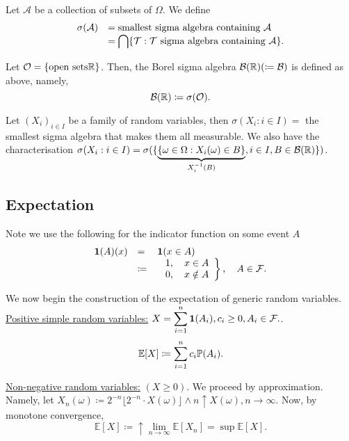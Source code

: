 \documentclass{article}
\begin{document}
Let $ \mathcal{A} $ be a collection of subsets of $ \Omega $. We define 
\[\begin{array}{ll}
	\sigma(\mathcal{A}) &= \text{smallest sigma algebra containing $ \mathcal{A} $} \\
     &=\displaystyle \bigcap \{\mathcal{T}:\mathcal{T} \text{ sigma algebra containing }\mathcal{A}\}.
\end{array}
\]

\begin{boxdef}\label{def: borel sigma alg}
	Let $ \mathcal{O} = \{\text{open sets} \mathbb{R}\} $. Then, the Borel sigma algebra $ \mathcal{B}(\mathbb{R})( \coloneq \mathcal{B} ) $ is defined as above, namely, 
	\[\mathcal{B}(\mathbb{R})\coloneq \sigma(\mathcal{O}).\]
\end{boxdef}

Let $ (X_i)_{i\in I} $ be a family of random variables, then $ \sigma(X_{i}:i\in I) =$ the smallest sigma algebra that makes them all measurable. We also have the characterisation 
$ \sigma(X_{i}: i\in I) = \sigma(\{\underbrace{\{\omega\in \Omega: X_{i}(\omega)\in B\}}_{X^{-1}_{i}(B)}, i\in I, B\in \mathcal{B}(\mathbb{R})\})$.

\subsection{Expectation}

Note we use the following for the indicator function on some event $ A $
\[\begin{array}{ll}
	\mathbf{1}(A)(x) &= \quad \mathbf{1}(x\in A)\\ 
     &\coloneqq \left. \begin{array}{cc}
    &1, \quad x\in A \\
    &0, \quad x\notin A
\end{array}\right\}, \quad A\in \mathcal{F}.
\end{array}
\]


We now begin the construction of the expectation of generic random variables.\\

\underline{Positive simple random variables:} $X = \displaystyle\sum^{
n}_{i=1}\mathbf{1}(A_{i}), c_{i}\geq 0, A_{i}\in\mathcal{F}.  $.
\[
	\mathbb{E}[X]\coloneqq\displaystyle\sum^{n}_{i=1}c_{i}\mathbb{P}(A_{i}). 
\]


\underline{Non-negative random variables:} $ (X\geq 0). $
We proceed by approximation. Namely, let $ X_{n}(\omega)\coloneqq 2^{-n}\lfloor 2^{-n}\cdot X(\omega)\rfloor \land n \uparrow X(\omega) , n\to \infty$. Now, by monotone convergence, 
\[
	\mathbb{E}[X]\coloneqq \uparrow \displaystyle\lim_{n\to\infty}\mathbb{E}[X_{n}]=\displaystyle\sup\mathbb{E}[X].
\]
\end{document}
